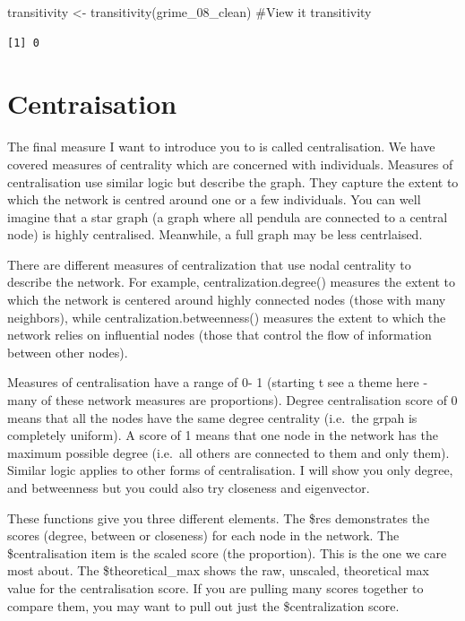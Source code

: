 \documentclass[
  letterpaper,
  DIV=11,
  numbers=noendperiod]{scrreprt}
\newenvironment{Shaded}{\begin{snugshade}}{\end{snugshade}}
\newcommand{\CommentTok}[1]{\textcolor[rgb]{0.37,0.37,0.37}{#1}}
\newcommand{\FunctionTok}[1]{\textcolor[rgb]{0.28,0.35,0.67}{#1}}
\newcommand{\NormalTok}[1]{\textcolor[rgb]{0.00,0.23,0.31}{#1}}
\newcommand{\OtherTok}[1]{\textcolor[rgb]{0.00,0.23,0.31}{#1}}
\begin{document}
\begin{Shaded}
\begin{Highlighting}[]
\NormalTok{transitivity }\OtherTok{\textless{}{-}} \FunctionTok{transitivity}\NormalTok{(grime\_08\_clean)}
\CommentTok{\#View it}
\NormalTok{transitivity}
\end{Highlighting}
\end{Shaded}

\begin{verbatim}
[1] 0
\end{verbatim}

\section{Centraisation}\label{centraisation}

The final measure I want to introduce you to is called centralisation.
We have covered measures of centrality which are concerned with
individuals. Measures of centralisation use similar logic but describe
the graph. They capture the extent to which the network is centred
around one or a few individuals. You can well imagine that a star graph
(a graph where all pendula are connected to a central node) is highly
centralised. Meanwhile, a full graph may be less centrlaised.

There are different measures of centralization that use nodal centrality
to describe the network. For example, centralization.degree() measures
the extent to which the network is centered around highly connected
nodes (those with many neighbors), while centralization.betweenness()
measures the extent to which the network relies on influential nodes
(those that control the flow of information between other nodes).

Measures of centralisation have a range of 0- 1 (starting t see a theme
here - many of these network measures are proportions). Degree
centralisation score of 0 means that all the nodes have the same degree
centrality (i.e.~the grpah is completely uniform). A score of 1 means
that one node in the network has the maximum possible degree (i.e.~all
others are connected to them and only them). Similar logic applies to
other forms of centralisation. I will show you only degree, and
betweenness but you could also try closeness and eigenvector.

These functions give you three different elements. The \$res
demonstrates the scores (degree, between or closeness) for each node in
the network. The \$centralisation item is the scaled score (the
proportion). This is the one we care most about. The \$theoretical\_max
shows the raw, unscaled, theoretical max value for the centralisation
score. If you are pulling many scores together to compare them, you may
want to pull out just the \$centralization score.
\end{document}
